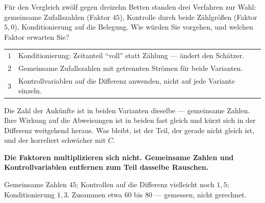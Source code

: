 \begin{aufgabe}
Für den Vergleich zwölf gegen dreizehn Betten standen drei Verfahren zur Wahl: gemeinsame Zufallszahlen (Faktor $45$), Kontrolle durch beide Zählgrößen (Faktor $5{,}0$), Konditionierung auf die Belegung. Wie würden Sie vorgehen, und welchen Faktor erwarten Sie?

\loesung
{}
\begin{center}
{\small
\renewcommand{\arraystretch}{1.5}
\begin{tabular}{@{}P{0.8cm}P{7.6cm}@{}}
\toprule
$1$ & Konditionierung: Zeitanteil \enquote{voll} statt Zählung --- ändert den Schätzer.\\
$2$ & Gemeinsame Zufallszahlen mit getrennten Strömen für beide Varianten.\\
$3$ & Kontrollvariablen auf die Differenz anwenden, nicht auf jede Variante einzeln.\\
\bottomrule
\end{tabular}}
\end{center}

Die Zahl der Ankünfte ist in beiden Varianten dieselbe --- gemeinsame Zahlen. Ihre Wirkung auf die Abweisungen ist in beiden fast gleich und kürzt sich in der Differenz weitgehend heraus. Was bleibt, ist der Teil, der gerade nicht gleich ist, und der korreliert schwächer mit $C$.

\begin{center}
\begin{minipage}{0.9\textwidth}
\textbf{Die Faktoren multiplizieren sich nicht. Gemeinsame Zahlen und Kontrollvariablen entfernen zum Teil dasselbe Rauschen.}
\end{minipage}
\end{center}

Gemeinsame Zahlen $45$; Kontrollen auf die Differenz vielleicht noch $1{,}5$; Konditionierung $1{,}3$. Zusammen etwa $60$ bis $80$ --- gemessen, nicht gerechnet.

\begin{center}
\begin{minipage}{0.88\textwidth}
\end{minipage}
\end{center}
\end{aufgabe}

